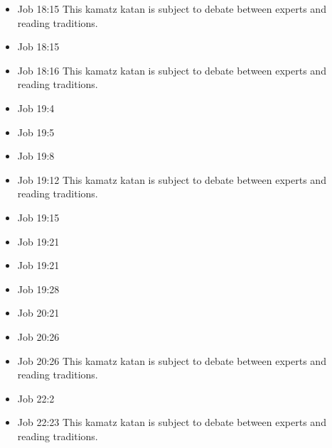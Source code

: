 \documentclass[14pt]{book}
\begin{document}
\begin{multicols}{2}
\begin{itemize}
															\item Job 18:15 This kamatz katan is subject to debate between experts and reading traditions.
															
															\item Job 18:15
															
															\item Job 18:16 This kamatz katan is subject to debate between experts and reading traditions.
															
															\item Job 19:4
															
															\item Job 19:5
															
															\item Job 19:8
															
															\item Job 19:12 This kamatz katan is subject to debate between experts and reading traditions.
															
															\item Job 19:15
															
															\item Job 19:21
															
															\item Job 19:21
															
															\item Job 19:28
															
															\item Job 20:21
															
															\item Job 20:26
															
															\item Job 20:26 This kamatz katan is subject to debate between experts and reading traditions.
															
															\item Job 22:2
															
															\item Job 22:23 This kamatz katan is subject to debate between experts and reading traditions.
															

\end{itemize}
\end{multicols}
\end{document}
